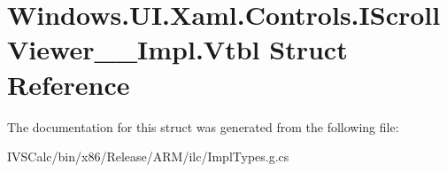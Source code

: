 \hypertarget{struct_windows_1_1_u_i_1_1_xaml_1_1_controls_1_1_i_scroll_viewer_____impl_1_1_vtbl}{}\section{Windows.\+U\+I.\+Xaml.\+Controls.\+I\+Scroll\+Viewer\+\_\+\+\_\+\+Impl.\+Vtbl Struct Reference}
\label{struct_windows_1_1_u_i_1_1_xaml_1_1_controls_1_1_i_scroll_viewer_____impl_1_1_vtbl}


The documentation for this struct was generated from the following file\+:\begin{DoxyCompactItemize}
\item 
I\+V\+S\+Calc/bin/x86/\+Release/\+A\+R\+M/ilc/Impl\+Types.\+g.\+cs\end{DoxyCompactItemize}

